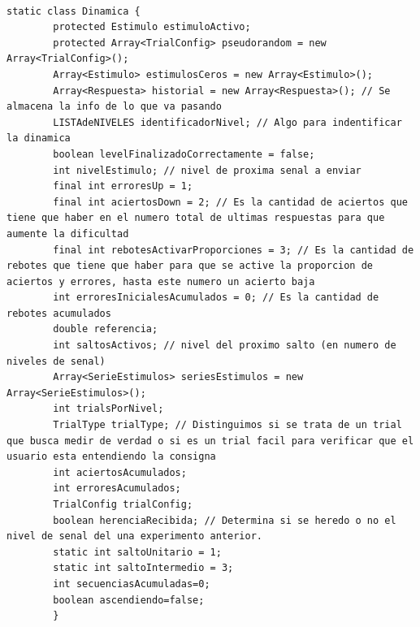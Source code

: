 \documentclass{article}
\begin{document}
 \begin{lstlisting}[caption=Definicion de la clase donde se almacena la información del StairCase]
 
static class Dinamica {
		protected Estimulo estimuloActivo;
		protected Array<TrialConfig> pseudorandom = new Array<TrialConfig>();
		Array<Estimulo> estimulosCeros = new Array<Estimulo>();
		Array<Respuesta> historial = new Array<Respuesta>(); // Se almacena la info de lo que va pasando
		LISTAdeNIVELES identificadorNivel; // Algo para indentificar la dinamica
		boolean levelFinalizadoCorrectamente = false;
		int nivelEstimulo; // nivel de proxima senal a enviar
		final int erroresUp = 1;
		final int aciertosDown = 2; // Es la cantidad de aciertos que tiene que haber en el numero total de ultimas respuestas para que aumente la dificultad
		final int rebotesActivarProporciones = 3; // Es la cantidad de rebotes que tiene que haber para que se active la proporcion de aciertos y errores, hasta este numero un acierto baja 
		int erroresInicialesAcumulados = 0; // Es la cantidad de rebotes acumulados
		double referencia;
		int saltosActivos; // nivel del proximo salto (en numero de niveles de senal)
		Array<SerieEstimulos> seriesEstimulos = new Array<SerieEstimulos>();
		int trialsPorNivel;
		TrialType trialType; // Distinguimos si se trata de un trial que busca medir de verdad o si es un trial facil para verificar que el usuario esta entendiendo la consigna
		int aciertosAcumulados;
		int erroresAcumulados;
		TrialConfig trialConfig;
		boolean herenciaRecibida; // Determina si se heredo o no el nivel de senal del una experimento anterior.
		static int saltoUnitario = 1;
		static int saltoIntermedio = 3;
		int secuenciasAcumuladas=0;
		boolean ascendiendo=false;
		}

 \end{lstlisting}
\end{document}
